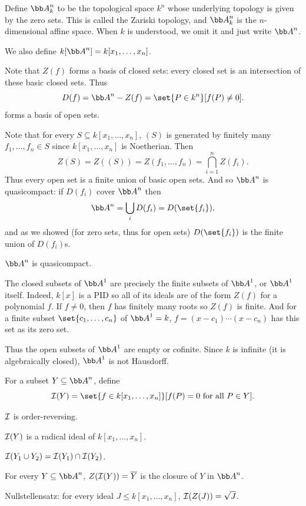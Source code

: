\bdefn

    Define $\bA^n_k$ to be the topological space $k^n$ whose underlying topology is given by the zero sets.
    This is called the {\emphcolor Zariski topology}, and $\bA^n_k$ is the {\emphcolor $n$-dimensional affine space}.
    When $k$ is understood, we omit it and just write $\bA^n$.

    We also define $k[\bA^n]=k[x_1,\dots,x_n]$.

\edefn

Note that $Z(f)$ forms a basis of closed sets: every closed set is an intersection of these basic closed sets.
Thus
$$ D(f) = \bA^n - Z(f) = \set{P\in k^n}[f(P)\neq0] . $$
forms a basis of open sets.

Note that for every $S\subseteq k[x_1,\dots,x_n]$, $(S)$ is generated by finitely many $f_1,\dots,f_n\in S$ since $k[x_1,\dots,x_n]$
is Noetherian.
Then
$$ Z(S) = Z((S)) = Z(f_1,\dots,f_n) = \bigcap_{i=1}^n Z(f_i) . $$
Thus every open set is a finite union of basic open sets.
And so $\bA^n$ is quasicompact: if $D(f_i)$ cover $\bA^n$ then
$$ \bA^n = \bigcup_i D(f_i) = D(\set{f_i}) , $$
and as we showed (for zero sets, thus for open sets) $D(\set{f_i})$ is the finite union of $D(f_i)$s.

\bprop

    $\bA^n$ is quasicompact.

\eprop

\bexam

    The closed subsets of $\bA^1$ are precisely the finite subsets of $\bA^1$, or $\bA^1$ itself.
    Indeed, $k[x]$ is a PID so all of its ideals are of the form $Z(f)$ for a polynomial $f$.
    If $f\neq0$, then $f$ has finitely many roots so $Z(f)$ is finite.
    And for a finite subset $\set{c_1,\dots,c_n}$ of $\bA^1=k$, $f=(x-c_1)\cdots(x-c_n)$ has this set as its zero set.

    Thus the open subsets of $\bA^1$ are empty or cofinite.
    Since $k$ is infinite (it is algebraically closed), $\bA^1$ is not Hausdorff.

\eexam

\bdefn

    For a subset $Y\subseteq\bA^n$, define
    $$ \I(Y) = \set{f\in k[x_1,\dots,x_n]}[f(P)=0\hbox{ for all $P\in Y$}] . $$

\edefn

\bprop

    \benum
        \item ${{\cal I}}$ is order-reversing.
        \item ${{\cal I}}(Y)$ is a radical ideal of $k[x_1,\dots,x_n]$.
        \item ${{\cal I}}(Y_1\cup Y_2)={{\cal I}}(Y_1)\cap{{\cal I}}(Y_2)$.
        \item For every $Y\subseteq\bA^n$, $Z({{\cal I}}(Y))={\overline{Y}}$ is the closure of $Y$ in $\bA^n$.
        \item {\emphcolor Nullstellensatz}: for every ideal $J\leq k[x_1,\dots,x_n]$, ${{\cal I}}(Z(J))=\sqrt J$.
    \eenum

